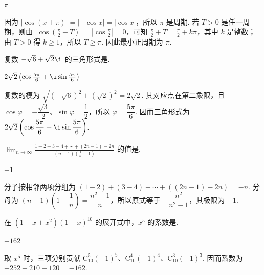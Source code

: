 \documentclass[UTF8,a4paper,oneside,11pt]{ctexbook}
\begin{document}
\begin{answer}
\(\pi\)
\end{answer}

\begin{solution}
因为 \(|\cos(x+\pi)|=|{-\cos x}|=|\cos x|\)，所以 \(\pi\) 是周期. 若 \(T>0\) 是任一周期，则由 \(|\cos(\frac\pi2+T)|=|\cos\frac\pi2|=0\)，可知 \(\frac\pi2+T=\frac\pi2+k\pi\)，其中 \(k\) 是整数；由 \(T>0\) 得 \(k\geqslant1\)，所以 \(T\geqslant\pi\). 因此最小正周期为 \(\pi\).
\end{solution}

\begin{problem}
复数 \(-\sqrt{6} + \sqrt{2}\i\) 的三角形式是\fillinblank{}.
\end{problem}

\begin{answer}
\(2\sqrt{2}\left(\cos \frac{5\pi}{6} + \i \sin \frac{5\pi}{6}\right)\)
\end{answer}

\begin{solution}
复数的模为 \(\sqrt{(-\sqrt6)^2+(\sqrt2)^2}=2\sqrt2\). 其对应点在第二象限，且 \(\cos\varphi=-\dfrac{\sqrt3}{2}\)、\(\sin\varphi=\dfrac12\)，所以 \(\varphi=\dfrac{5\pi}{6}\). 因而三角形式为 \(2\sqrt2\left(\cos\dfrac{5\pi}{6}+\i\sin\dfrac{5\pi}{6}\right)\).
\end{solution}

\begin{problem}
\(\displaystyle\lim_{n \to \infty}\frac{1 - 2 + 3 - 4 + \cdots + (2n - 1) - 2n}{(n - 1)\left(\frac{1}{n} + 1\right)}\) 的值是\fillinblank{}.
\end{problem}

\begin{answer}
\(-1\)
\end{answer}

\begin{solution}
分子按相邻两项分组为 \((1-2)+(3-4)+\cdots+((2n-1)-2n)=-n\). 分母为 \((n-1)\left(1+\dfrac1n\right)=\dfrac{n^2-1}{n}\)，所以原式等于 \(-\dfrac{n^2}{n^2-1}\)，其极限为 \(-1\).
\end{solution}

\begin{problem}
在 \((1 + x + x^2)(1 - x)^{10}\) 的展开式中，\(x^5\) 的系数是\fillinblank{}.
\end{problem}

\begin{answer}
\(-162\)
\end{answer}

\begin{solution}
取 \(x^5\) 时，三项分别贡献 \(\mathrm C_{10}^{5}(-1)^5\)、\(\mathrm C_{10}^{4}(-1)^4\)、\(\mathrm C_{10}^{3}(-1)^3\). 因而系数为 \(-252+210-120=-162\).
\end{solution}
\end{document}
